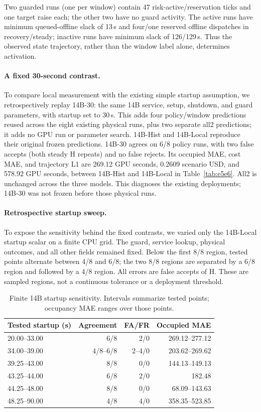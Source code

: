 Two guarded runs (one per window) contain 47 risk-active/reservation ticks
and one target raise each; the other two have no guard activity. The active
runs have minimum queued-offline slack of 13\,s and four/one reserved offline
dispatches in recovery/steady; inactive runs have minimum slack of 126/129\,s.
Thus the observed state trajectory, rather than the window label alone,
determines activation.

\paragraph{A fixed 30-second contrast.}
To compare local measurement with the existing simple startup assumption,
we retrospectively replay 14B-30: the same 14B service, setup, shutdown,
and guard parameters, with startup set to 30\,s. This adds four policy/window
predictions reused across the eight existing physical runs, plus two separate
all2 predictions; it adds no GPU run or parameter search. 14B-Hist and 14B-Local reproduce
their original frozen predictions. 14B-30 agrees on 6/8 policy runs, with two
false accepts (both steady H repeats) and no false rejects. Its occupied MAE,
cost MAE, and trajectory L1 are 269.12 GPU seconds, 0.2609 scenario USD, and
578.92 GPU seconds, between 14B-Hist and 14B-Local in Table~\ref{tab:e5e6}. All2 is
unchanged across the three models. This diagnoses the existing deployments;
14B-30 was not frozen before those physical runs.

\paragraph{Retrospective startup sweep.}
To expose the sensitivity behind the fixed contrasts, we varied only the
14B-Local startup scalar on a finite CPU grid. The guard, service lookup,
physical outcomes, and all other fields remained fixed. Below the first 8/8 region, tested points alternate between 4/8 and 6/8; the
two 8/8 regions are separated by a 6/8 region and followed by a 4/8 region.
All errors are false accepts of H. These are sampled regions, not a continuous
tolerance or a deployment threshold.

\begin{table}[t]
\centering
\scriptsize
\setlength{\tabcolsep}{3pt}
\caption{Finite 14B startup sensitivity. Intervals summarize tested points;
occupancy MAE ranges over those points.}
\label{tab:14bsweep}
\begin{tabular*}{\linewidth}{@{\extracolsep{\fill}}lrrr@{}}
\toprule
Tested startup (s) & Agreement & FA/FR & Occupied MAE\\
\midrule
20.00--33.00 & 6/8 & 2/0 & 269.12--277.12\\
34.00--39.00 & 4/8--6/8 & 2--4/0 & 203.62--269.62\\
39.25--43.00 & 8/8 & 0/0 & 144.13--149.13\\
43.25--44.00 & 6/8 & 2/0 & 182.48\\
44.25--48.00 & 8/8 & 0/0 & 68.09--143.63\\
48.25--90.00 & 4/8 & 4/0 & 358.35--523.85\\
\bottomrule
\end{tabular*}
\end{table}

